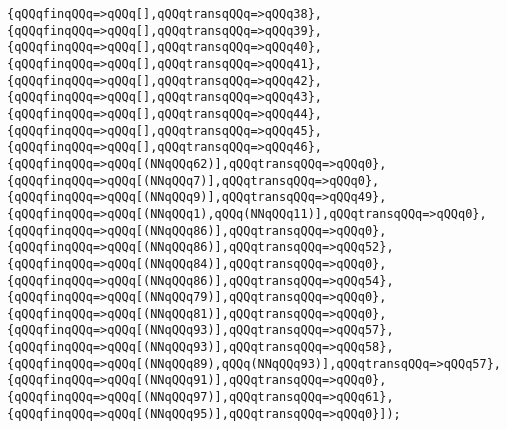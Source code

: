 \verb|{qQQqfinqQQq=>qQQq[],qQQqtransqQQq=>qQQq38},|\newline
\verb|{qQQqfinqQQq=>qQQq[],qQQqtransqQQq=>qQQq39},|\newline
\verb|{qQQqfinqQQq=>qQQq[],qQQqtransqQQq=>qQQq40},|\newline
\verb|{qQQqfinqQQq=>qQQq[],qQQqtransqQQq=>qQQq41},|\newline
\verb|{qQQqfinqQQq=>qQQq[],qQQqtransqQQq=>qQQq42},|\newline
\verb|{qQQqfinqQQq=>qQQq[],qQQqtransqQQq=>qQQq43},|\newline
\verb|{qQQqfinqQQq=>qQQq[],qQQqtransqQQq=>qQQq44},|\newline
\verb|{qQQqfinqQQq=>qQQq[],qQQqtransqQQq=>qQQq45},|\newline
\verb|{qQQqfinqQQq=>qQQq[],qQQqtransqQQq=>qQQq46},|\newline
\verb|{qQQqfinqQQq=>qQQq[(NNqQQq62)],qQQqtransqQQq=>qQQq0},|\newline
\verb|{qQQqfinqQQq=>qQQq[(NNqQQq7)],qQQqtransqQQq=>qQQq0},|\newline
\verb|{qQQqfinqQQq=>qQQq[(NNqQQq9)],qQQqtransqQQq=>qQQq49},|\newline
\verb|{qQQqfinqQQq=>qQQq[(NNqQQq1),qQQq(NNqQQq11)],qQQqtransqQQq=>qQQq0},|\newline
\verb|{qQQqfinqQQq=>qQQq[(NNqQQq86)],qQQqtransqQQq=>qQQq0},|\newline
\verb|{qQQqfinqQQq=>qQQq[(NNqQQq86)],qQQqtransqQQq=>qQQq52},|\newline
\verb|{qQQqfinqQQq=>qQQq[(NNqQQq84)],qQQqtransqQQq=>qQQq0},|\newline
\verb|{qQQqfinqQQq=>qQQq[(NNqQQq86)],qQQqtransqQQq=>qQQq54},|\newline
\verb|{qQQqfinqQQq=>qQQq[(NNqQQq79)],qQQqtransqQQq=>qQQq0},|\newline
\verb|{qQQqfinqQQq=>qQQq[(NNqQQq81)],qQQqtransqQQq=>qQQq0},|\newline
\verb|{qQQqfinqQQq=>qQQq[(NNqQQq93)],qQQqtransqQQq=>qQQq57},|\newline
\verb|{qQQqfinqQQq=>qQQq[(NNqQQq93)],qQQqtransqQQq=>qQQq58},|\newline
\verb|{qQQqfinqQQq=>qQQq[(NNqQQq89),qQQq(NNqQQq93)],qQQqtransqQQq=>qQQq57},|\newline
\verb|{qQQqfinqQQq=>qQQq[(NNqQQq91)],qQQqtransqQQq=>qQQq0},|\newline
\verb|{qQQqfinqQQq=>qQQq[(NNqQQq97)],qQQqtransqQQq=>qQQq61},|\newline
\verb|{qQQqfinqQQq=>qQQq[(NNqQQq95)],qQQqtransqQQq=>qQQq0}]);|\newline
